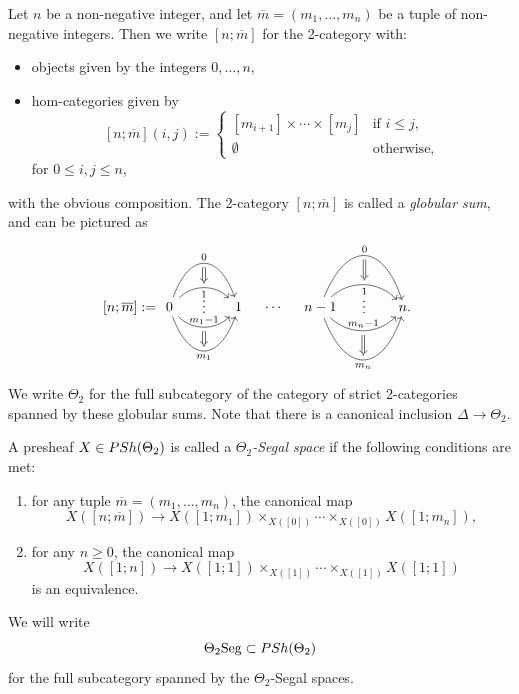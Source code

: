 \documentclass[a4paper, 11pt]{amsart}
\numberwithin{theorem}{section}
\theoremstyle{definition}
\newcommand{\cat}[1]{\textup{#1}}
\newcommand{\Seg}{\mathrm{Seg}}
\newcommand{\PSh}{\cat{PSh}}
\begin{document}
\begin{definition}
	Let $n$ be a non-negative integer, and let $\overline{m} = (m_1, \dotsc, m_{n})$ be a tuple of non-negative integers. 
	Then we write $[n;\overline{m}]$ for the 2-category with:
	\begin{itemize}
		\item objects given by the integers $0, \dotsc, n$,
		\item hom-categories given by  \[
		[n;\overline{m}](i,j) := \begin{cases}
			[m_{i+1}] \times \dotsb \times [m_{j}] & \text{if $i \leq j$}, \\
			\emptyset & \text{otherwise},
		\end{cases}
		\]
		for $0\leq i,j \leq n$,
	\end{itemize}
	with the obvious composition.
	The 2-category $[n;\overline{m}]$ is called a \textit{globular sum}, and can be pictured as 
	\[
		{[n;\overline{m}]} := \begin{tikzcd}[column sep = large]
			0 \arrow[r, "0"name=a0, looseness = 2, bend left = 70pt ]\arrow[r, "1"'name=a1, bend left = 45pt]\arrow[r, "m_1-1"name=am1, bend right = 45pt]\arrow[r, "m_1"'name=am, looseness = 2, bend right = 70pt] & 1	
			\arrow[from=a0,to=a1, Rightarrow, shorten <= 3pt, shorten >= 3pt]
			\arrow[from=a1,to=am1, phantom, "\vdots", yshift = 3pt]
			\arrow[from=am1,to=am, Rightarrow, shorten <= 3pt, shorten >= 3pt] \arrow[r, phantom, "\cdots"] &  
			n-1\arrow[r, "0"name=b0, looseness = 2, bend left = 70pt ]\arrow[r, "1"'name=b1, bend left = 45pt]\arrow[r, "m_n-1"name=bm1, bend right = 45pt]\arrow[r, "m_n"'name=bm, looseness = 2, bend right = 70pt] & n.	
			\arrow[from=b0,to=b1, Rightarrow, shorten <= 3pt, shorten >= 3pt]
			\arrow[from=b1,to=bm1, phantom, "\vdots", yshift = 3pt]
			\arrow[from=bm1,to=bm, Rightarrow, shorten <= 3pt, shorten >= 3pt]
		\end{tikzcd}
	\] We write $\Theta_2$ for the full subcategory of the category 
	of strict 2-categories spanned by these globular sums. 
	Note that there is a canonical inclusion $\Delta \to \Theta_2$.
\end{definition}

\begin{definition}
	A presheaf $X \in \PSh(\Theta_2)$ is called a \textit{$\Theta_2$-Segal space} if the following conditions are met: 
	\begin{enumerate}
		\item for any tuple $\overline{m} = (m_1, \dotsc, m_{n})$, the canonical map 
		$$
		X([n;\overline{m}]) \to X([1;m_1]) \times_{X([0])} \dotsb \times_{X([0])} X([1;m_n]),
		$$
		\item for any $n \geq 0$, the canonical map 
		$$
		X([1;n]) \to X([1;1]) \times_{X([1])} \dotsb \times_{X([1])} X([1;1])
		$$
		is an equivalence.
	\end{enumerate}
	We will write 
	$$
	\Theta_2\Seg \subset \PSh(\Theta_2)
	$$
	for the full subcategory spanned by the $\Theta_2$-Segal spaces.
\end{definition}
\end{document}
